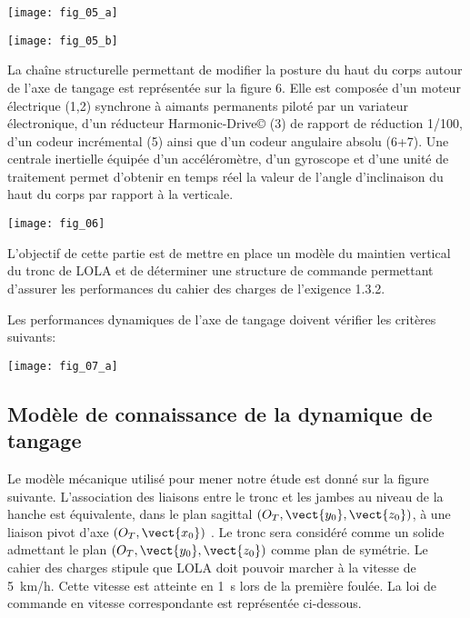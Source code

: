 \begin{multicols}{2}
\begin{center}
\texttt{[image: fig\_05\_a]}
\end{center}


\begin{center}
\texttt{[image: fig\_05\_b]}
\end{center}

La chaîne structurelle permettant de modifier la posture du haut du corps autour de l'axe de tangage est
représentée sur la figure 6. Elle est composée d’un moteur électrique (1,2) synchrone à aimants
permanents piloté par un variateur électronique, d’un réducteur
Harmonic-Drive© (3) de rapport de réduction 1/100, d’un codeur
incrémental (5) ainsi que d’un codeur angulaire absolu (6+7).
Une centrale inertielle équipée d'un accéléromètre, d'un gyroscope et
d'une unité de traitement permet d'obtenir en temps réel la valeur de
l'angle d'inclinaison du haut du corps par rapport à la verticale.


\begin{center}
\texttt{[image: fig\_06]}
\end{center}


\begin{obj}
L'objectif de cette partie est de mettre en place un modèle du maintien
vertical du tronc de LOLA et de déterminer une structure de
commande permettant d'assurer les performances du cahier des
charges de l'exigence 1.3.2.
\end{obj}

Les performances dynamiques de l'axe de tangage doivent vérifier les critères suivants:
\begin{center}
\texttt{[image: fig\_07\_a]}
\end{center}

\subsection*{Modèle de connaissance de la dynamique de tangage}

Le modèle mécanique utilisé pour mener notre étude est donné sur la figure suivante. L'association des liaisons entre
le tronc et les jambes au niveau de la hanche est équivalente, dans le plan sagittal $\left(O_T,\vect{y_0},\vect{z_0}\right)$, à une liaison pivot d'axe $\left(O_T,\vect{x_0}\right)$ . Le tronc sera considéré comme un solide admettant le plan $\left(O_T,\vect{y_0},\vect{z_0}\right)$ comme plan de
symétrie. Le cahier des charges stipule que LOLA doit pouvoir marcher à la vitesse de \SI{5}{km/h}. Cette vitesse
est atteinte en \SI{1}{s} lors de la première foulée. La loi de commande en vitesse correspondante est représentée
ci-dessous.


\end{multicols}
